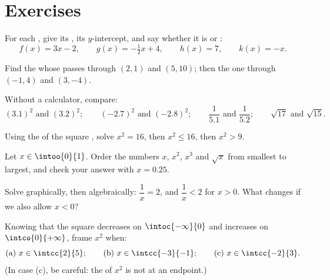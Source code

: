 \section{Exercises}

\begin{exercise}[$\star$]\label{exo:g10:reffunc:1}
For each , give its , its $y$-intercept, and say
whether it is  or :
\[
f(x) = 3x - 2, \qquad
g(x) = -\tfrac12 x + 4, \qquad
h(x) = 7, \qquad
k(x) = -x .
\]
\end{exercise}

\begin{exercise}[$\star$]\label{exo:g10:reffunc:2}
Find the  whose  passes through $(2, 1)$ and
$(5, 10)$; then the one through $(-1, 4)$ and $(3, -4)$.
\end{exercise}

\begin{exercise}[$\star$]\label{exo:g10:reffunc:3}
Without a calculator, compare:
\[
(3.1)^2 \text{ and } (3.2)^2; \qquad
(-2.7)^2 \text{ and } (-2.8)^2; \qquad
\frac{1}{5.1} \text{ and } \frac{1}{5.2}; \qquad
\sqrt{17} \text{ and } \sqrt{15}.
\]
\end{exercise}

\begin{exercise}[$\star$]\label{exo:g10:reffunc:4}
Using the  of the square , solve $x^2 = 16$, then
$x^2 \leq 16$, then $x^2 > 9$.
\end{exercise}

\begin{exercise}[$\star$]\label{exo:g10:reffunc:5}
Let $x \in \intoo{0}{1}$. Order the numbers $x$, $x^2$, $x^3$ and
$\sqrt x$ from smallest to largest, and check your answer with
$x = 0.25$.
\end{exercise}

\begin{exercise}[$\star\star$]\label{exo:g10:reffunc:6}
Solve graphically, then algebraically: $\dfrac1x = 2$, and
$\dfrac1x < 2$ for $x > 0$. What changes if we also allow $x < 0$?
\end{exercise}

\begin{exercise}[$\star\star$]\label{exo:g10:reffunc:7}
Knowing that the square  decreases on $\intoc{-\infty}{0}$ and
increases on $\intco{0}{+\infty}$, frame $x^2$ when:
\[
\text{(a) } x \in \intcc{2}{5};
\qquad
\text{(b) } x \in \intcc{-3}{-1};
\qquad
\text{(c) } x \in \intcc{-2}{3}.
\]
(In case (c), be careful: the  of $x^2$ is not at an endpoint.)
\end{exercise}

